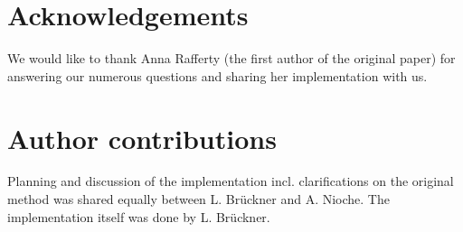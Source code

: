 \section{Acknowledgements}
We would like to thank Anna Rafferty (the first author of the original paper) for answering our numerous questions and sharing her implementation with us.

\section{Author contributions}
Planning and discussion of the implementation incl. clarifications on the original method was shared equally between L. Brückner and A. Nioche. The implementation itself was done by L. Brückner.
